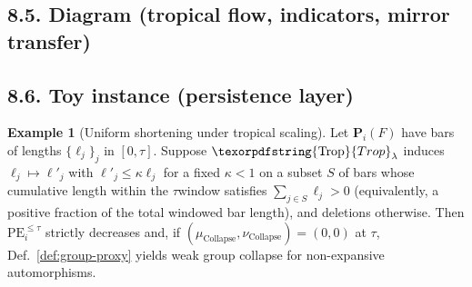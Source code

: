 \documentclass[11pt]{article}
\DeclareMathOperator{\Ext}{Ext}
\DeclareRobustCommand{\hyp}{\nobreakdash-}
\newcommand{\Rfun}{\mathcal{R}}
\numberwithin{equation}{section}
\theoremstyle{definition}
\newtheorem{example}[theorem]{Example}
\DeclareRobustCommand{\Ttau}{\texorpdfstring{\ensuremath{\mathbf{T}_{\tau}}}{T\_\tau}}
\DeclareRobustCommand{\Ctau}{\texorpdfstring{\ensuremath{C_{\tau}}}{C\_\tau}}
\DeclareRobustCommand{\LC}{\texorpdfstring{\ensuremath{\mathrm{(LC)}}}{(LC)}}
\DeclareRobustCommand{\Trop}{\texorpdfstring{\ensuremath{\operatorname{Trop}}}{Trop}}
\DeclareRobustCommand{\Mirror}{\texorpdfstring{\ensuremath{\operatorname{Mirror}}}{Mirror}}
\providecommand{\n}{\unskip\space}
\begin{document}
\subsection*{8.5. Diagram (tropical flow, indicators, mirror transfer)}
\begin{center}
\end{center}

\subsection*{8.6. Toy instance (persistence layer)}
\begin{example}[Uniform shortening under tropical scaling]\label{ex:trop}
Let \(\mathbf{P}_i(F)\) have bars of lengths \(\{\ell_j\}_j\) in \([0,\tau]\).
Suppose \(\Trop_\lambda\) induces \(\ell_j\mapsto \ell'_j\) with \(\ell'_j\le \kappa\ell_j\) for a fixed \(\kappa<1\) on a subset \(S\) of bars whose cumulative length within the \(\tau\)\nobreakdash window satisfies \(\sum_{j\in S}\ell_j>0\)
(equivalently, a positive fraction of the total windowed bar length), and deletions otherwise.
Then \(\mathrm{PE}_i^{\le\tau}\) strictly decreases and, if \((\mu_{\mathrm{Collapse}},\nu_{\mathrm{Collapse}})=(0,0)\) at \(\tau\), Def.~\ref{def:group-proxy} yields weak group collapse for non\hyp expansive automorphisms.
\end{example}
\end{document}
